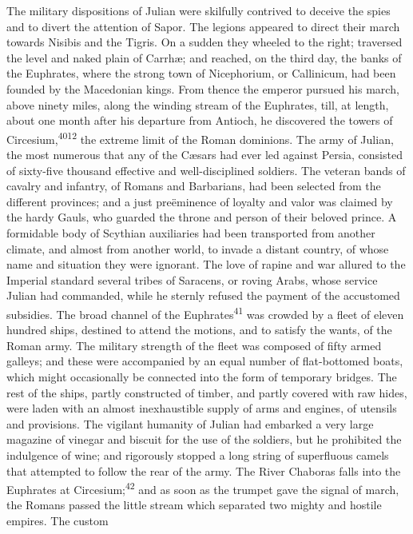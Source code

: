 The military dispositions of Julian were skilfully contrived to
deceive the spies and to divert the attention of Sapor. The
legions appeared to direct their march towards Nisibis and the
Tigris. On a sudden they wheeled to the right; traversed the
level and naked plain of Carrhæ; and reached, on the third day,
the banks of the Euphrates, where the strong town of Nicephorium,
or Callinicum, had been founded by the Macedonian kings. From
thence the emperor pursued his march, above ninety miles, along
the winding stream of the Euphrates, till, at length, about one
month after his departure from Antioch, he discovered the towers
of Circesium,\textsuperscript{4012} the extreme limit of the Roman dominions. The
army of Julian, the most numerous that any of the Cæsars had ever
led against Persia, consisted of sixty-five thousand effective
and well-disciplined soldiers. The veteran bands of cavalry and
infantry, of Romans and Barbarians, had been selected from the
different provinces; and a just preëminence of loyalty and valor
was claimed by the hardy Gauls, who guarded the throne and person
of their beloved prince. A formidable body of Scythian
auxiliaries had been transported from another climate, and almost
from another world, to invade a distant country, of whose name
and situation they were ignorant. The love of rapine and war
allured to the Imperial standard several tribes of Saracens, or
roving Arabs, whose service Julian had commanded, while he
sternly refused the payment of the accustomed subsidies. The
broad channel of the Euphrates\textsuperscript{41} was crowded by a fleet of
eleven hundred ships, destined to attend the motions, and to
satisfy the wants, of the Roman army. The military strength of
the fleet was composed of fifty armed galleys; and these were
accompanied by an equal number of flat-bottomed boats, which
might occasionally be connected into the form of temporary
bridges. The rest of the ships, partly constructed of timber, and
partly covered with raw hides, were laden with an almost
inexhaustible supply of arms and engines, of utensils and
provisions. The vigilant humanity of Julian had embarked a very
large magazine of vinegar and biscuit for the use of the
soldiers, but he prohibited the indulgence of wine; and
rigorously stopped a long string of superfluous camels that
attempted to follow the rear of the army. The River Chaboras
falls into the Euphrates at Circesium;\textsuperscript{42} and as soon as the
trumpet gave the signal of march, the Romans passed the little
stream which separated two mighty and hostile empires. The custom
